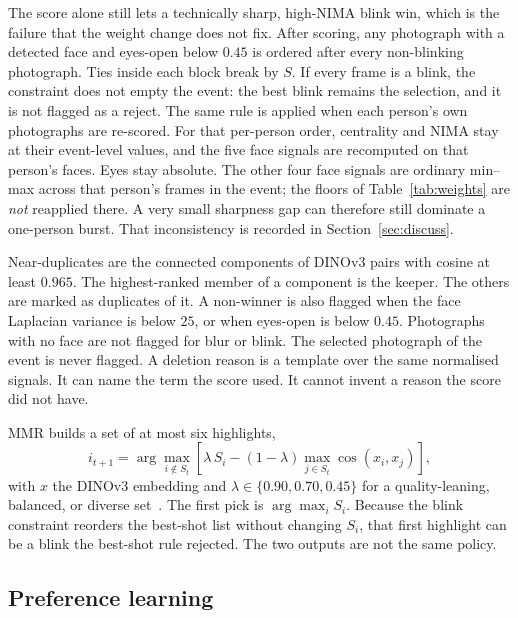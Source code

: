 \documentclass[conference]{IEEEtran}
\begin{document}
The score alone still lets a technically sharp, high-NIMA blink win, which is
the failure that the weight change does not fix. After scoring, any photograph
with a detected face and eyes-open below $0.45$ is ordered after every
non-blinking photograph. Ties inside each block break by $S$. If every frame
is a blink, the constraint does not empty the event: the best blink remains
the selection, and it is not flagged as a reject. The same rule is applied
when each person's own photographs are re-scored. For that per-person order,
centrality and NIMA stay at their event-level values, and the five face
signals are recomputed on that person's faces. Eyes stay absolute. The other
four face signals are ordinary min--max across that person's frames in the
event; the floors of Table~\ref{tab:weights} are \emph{not} reapplied there.
A very small sharpness gap can therefore still dominate a one-person burst.
That inconsistency is recorded in Section~\ref{sec:discuss}.

Near-duplicates are the connected components of \mbox{DINOv3} pairs with cosine at
least $0.965$. The highest-ranked member of a component is the keeper. The
others are marked as duplicates of it. A non-winner is also flagged when the
face Laplacian variance is below $25$, or when eyes-open is below $0.45$.
Photographs with no face are not flagged for blur or blink. The selected
photograph of the event is never flagged. A deletion reason is a template over
the same normalised signals. It can name the term the score used. It cannot
invent a reason the score did not have.

MMR builds a set of at most six highlights,
\begin{equation}
i_{t+1}
=
\arg\max_{i\notin S_t}
\left[
\lambda\, S_i
-
(1-\lambda)
\max_{j\in S_t} \cos(x_i, x_j)
\right],
\label{eq:mmr}
\end{equation}
with $x$ the \mbox{DINOv3} embedding and $\lambda\in\{0.90, 0.70, 0.45\}$ for a
quality-leaning, balanced, or diverse set~\cite{carbonell1998mmr}. The first
pick is $\arg\max_i S_i$. Because the blink constraint reorders the best-shot
list without changing $S_i$, that first highlight can be a blink the best-shot
rule rejected. The two outputs are not the same policy.

\subsection{Preference learning}
\label{sec:pref}
\end{document}
